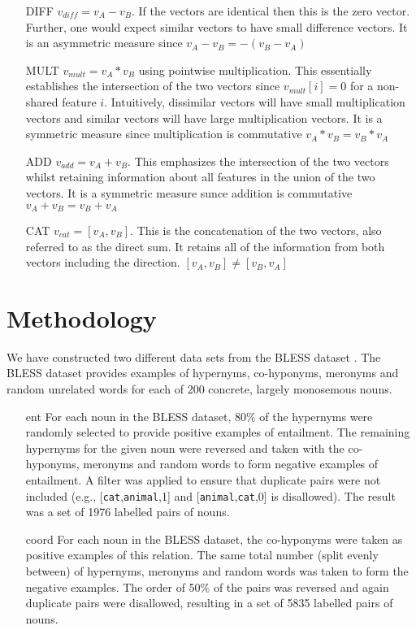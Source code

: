 \documentclass[11pt]{article}
\begin{document}
\begin{itemize}
\item[DIFF]{$v_{diff} = v_A - v_B$.  If the vectors are identical then this is the zero vector.  Further, one would expect similar vectors to have small difference vectors.  It is an asymmetric measure since $v_A - v_B = -(v_B - v_A)$ }
\item[MULT]{$v_{mult} = v_A * v_B$ using pointwise multiplication.  This essentially establishes the intersection of the two vectors since $v_{mult}[i] = 0$ for a non-shared feature $i$.   Intuitively,  dissimilar vectors will have small multiplication vectors and similar vectors will have large multiplication vectors.  It is a symmetric measure since multiplication is commutative $v_A * v_B = v_B * v_A$ }
\item[ADD]{$v_{add} = v_A + v_B$.  This emphasizes the intersection of the two vectors whilst retaining information about all features in the union of the two vectors.  It is a symmetric measure sunce addition is commutative $v_A + v_B = v_B + v_A$}
\item[CAT]{$v_{cat} = [v_A,v_B]$.  This is the concatenation of the two vectors, also referred to as the direct sum.  It retains all of the information from both vectors including the direction.    $[v_A,v_B] \neq [v_B,v_A]$}
\end{itemize}

\section{Methodology}

We have constructed two different data sets from the BLESS dataset \cite{Baroni2011}.  The BLESS dataset provides examples of hypernyms, co-hyponyms, meronyms and random unrelated words for each of 200 concrete, largely monosemous nouns.

\begin{itemize}
\item[ent]{For each noun in the BLESS dataset, 80\% of the hypernyms were randomly selected to provide positive examples of entailment.  The remaining hypernyms for the given noun were reversed and taken with the co-hyponyms, meronyms and random words to form negative examples of entailment.  A filter was applied to ensure that duplicate pairs were not included (e.g., [\texttt{cat},\texttt{animal},1] and [\texttt{animal},\texttt{cat},0] is disallowed). The result was a set of 1976 labelled pairs of nouns.}
\item[coord]{For each noun in the BLESS dataset, the co-hyponyms were taken as positive examples of this relation.  The same total number (split evenly between) of hypernyms, meronyms and random words was taken to form the negative examples.  The order of 50\% of the pairs was reversed and again duplicate pairs were disallowed, resulting in a set of 5835 labelled pairs of nouns.}
\end{itemize}
\end{document}
